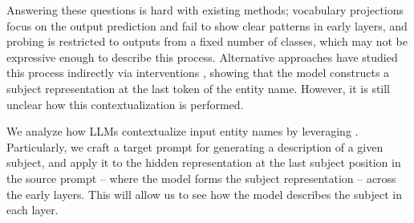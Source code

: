 \documentclass{article}
\theoremstyle{plain}
\theoremstyle{definition}
\theoremstyle{remark}
\begin{document}
Answering these questions is hard with existing methods; vocabulary projections focus on the output prediction and fail to show clear patterns in early layers, and probing is restricted to outputs from a fixed number of classes, which may not be expressive enough to describe this process. 
Alternative approaches have studied this process indirectly via interventions \cite{meng2022locating}, showing that the model constructs a subject representation at the last token of the entity name. However, it is still unclear how this contextualization is performed. 

We analyze how LLMs contextualize input entity names by leveraging \methodFamilyName{}.
Particularly, we craft a target prompt for generating a description of a given subject, and apply it to the hidden representation at the last subject position in the source prompt -- where the model forms the subject representation \cite{geva-etal-2023-dissecting, hernandez2023measuring} -- across the early layers. This will allow us to see how the model describes the subject in each layer.

\begin{table}[t!]
\caption{Illustrating entity resolution via a qualitative example. The expressive generations show that as we go through the layers, more tokens from the context get integrated into the current representation. The ``Generation'' column shows the automatically generated text. The ``Explanation'' column shows our own manually coded interpretation, aiming to specify what entity the generation refers to and how that relates to the tokens processed. $\targetModel=\sourceModel \is \text{Vicuna (13B)}$, $\targetLayer = \sourceLayer$, $\sourcePrompt \is \texttt{"Diana,\,Princess\;of\;Wales"}$.}
\vspace{.5em}
\label{tab:entity-resolution-samples}
\def\arraystretch{1.85}
\vspace{-0.5em}
\end{table}
\end{document}
